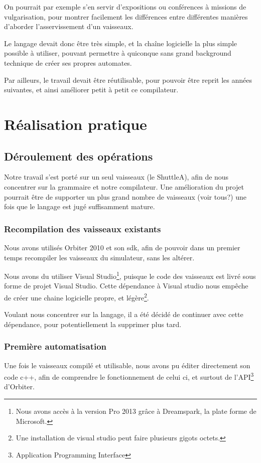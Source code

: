 \documentclass[a4paper,11pt]{article}
\begin{document}
        On pourrait par exemple s'en servir d'expositions ou conférences à missions de vulgarisation, pour montrer facilement les différences entre différentes manières d'aborder l'asservissement d'un vaisseaux.

        Le langage devait donc être très simple, et la chaîne logicielle la plus simple possible à utiliser, pouvant permettre à quiconque sans grand background technique de créer ses propres automates.

        Par ailleurs, le travail devait être réutilisable, pour pouvoir être reprit les années suivantes, et ainsi améliorer petit à petit ce compilateur.

\section{Réalisation pratique}
    \subsection{Déroulement des opérations}
        Notre travail s'est porté sur un seul vaisseaux (le ShuttleA), afin de nous concentrer sur la grammaire et notre compilateur. Une amélioration du projet pourrait être de supporter un plus grand nombre de vaisseaux (voir tous?) une fois que le langage est jugé suffisamment mature.

    \subsubsection{Recompilation des vaisseaux existants}
        Nous avons utilisés Orbiter 2010 et son sdk, afin de pouvoir dans un premier temps recompiler les vaisseaux du simulateur, sans les altérer.

        Nous avons du utiliser Visual Studio\footnote{Nous avons accès à la version Pro 2013 grâce à Dreamspark, la plate forme de Microsoft.}, puisque le code des vaisseaux est livré sous forme de projet Visual Studio. Cette dépendance à Visual studio nous empêche de créer une chaine logicielle propre, et légère\footnote{Une installation de visual studio peut faire plusieurs gigots octets.}.

        Voulant nous concentrer sur la langage, il a été décidé de continuer avec cette dépendance, pour potentiellement la supprimer plus tard.

    \subsubsection{Première automatisation}
        Une fois le vaisseaux compilé et utilisable, nous avons pu éditer directement son code c++, afin de comprendre le fonctionnement de celui ci, et surtout de l'API\footnote{Application Programming Interface} d'Orbiter.
\end{document}
